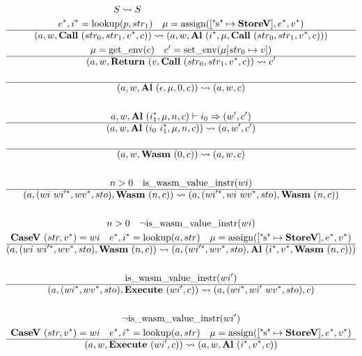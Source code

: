 \begin{gather*}
\newline \\
  S \leadsto S
%
\newline \\
  \seq e, \seq i = \lookup(p, str_1) \quad \mu = \assign([\text{"s"} \mapsto \storev], \seq e, \seq v) \\
  \hline
  (a, w, \call ~ (str_0, str_1, \seq v, c)) \leadsto (a, w, \al ~ (\seq i, \mu, \call ~ (str_0, str_1, \seq v, c))) \\
%
  \mu = \getenv(c) \quad c' = \setenv(\mu[str_0 \mapsto v]) \\
  \hline
  (a, w, \ret ~ (v, \call ~ (str_0, str_1, \seq v, c)) \leadsto c' \\
%
\newline \\
  \hline
  (a, w, \al ~ (\epsilon, \mu, 0, c)) \leadsto (a, w, c) \\
%
\newline \\
  a, w, \al ~ (\seq{i_1}, \mu, n, c) \vdash i_0 \Rightarrow (w', c') \\
  \hline
  (a, w, \al ~ (i_0 ~ \seq{i_1}, \mu, n, c)) \leadsto (a, w', c') \\
%
\newline \\
  \hline
  (a, w, \wasm ~ (0, c)) \leadsto (a, w, c) \\
%
\newline \\
  n > 0 \quad \iswasmvalueinstr(wi) \\
  \hline
  (a, (wi ~ \seq{wi'}, \seq{wv}, sto), \wasm ~ (n, c))
  \leadsto
  (a, (\seq{wi'}, wi ~ \seq{wv}, sto), \wasm ~ (n, c)) \\
%
\newline \\
  n > 0 \quad \neg \iswasmvalueinstr(wi) \\
  \casev ~ (str, \seq v) = wi \quad
  \seq e, \seq i = \lookup(a, str) \quad
  \mu = \assign([\text{"s"} \mapsto \storev], \seq e, \seq v) \\
  \hline
  (a, (wi ~ \seq{wi'}, \seq{wv}, sto), \wasm ~ (n, c))
  \leadsto
  (a, (\seq{wi'}, \seq{wv}, sto), \al ~ (\seq i, \seq v, \wasm ~ (n, c))) \\
%
\newline \\
  \iswasmvalueinstr(wi') \\
  \hline
  (a, (\seq{wi}, \seq{wv}, sto), \exe ~ (wi', c))
  \leadsto
  (a, (\seq{wi}, wi' ~ \seq{wv}, sto), c) \\
%
\newline \\
  \neg \iswasmvalueinstr(wi') \\
  \casev ~ (str, \seq v) = wi \quad
  \seq e, \seq i = \lookup(a, str) \quad
  \mu = \assign([\text{"s"} \mapsto \storev], \seq e, \seq v) \\
  \hline
  (a, w, \exe ~ (wi', c)) \leadsto (a, w, \al ~ (\seq i, \seq v, c)) \\
\end{gather*}
